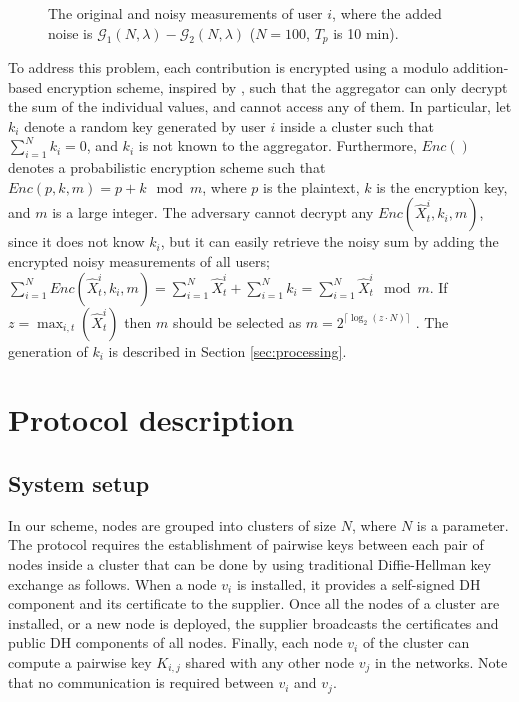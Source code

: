 \documentclass[11pt,a4paper]{article}
\theoremstyle{plain}
\theoremstyle{plain}
\theoremstyle{plain}
\theoremstyle{plain}
\theoremstyle{nonumberplain} \theoremseparator{}
\begin{document}
\begin{figure*}[ht]
\centering
{}
\caption{\label{fig:ill_noise} The original and noisy measurements of user $i$, where the added noise is $\mathcal{G}_{1}(N, \lambda) - \mathcal{G}_{2}(N, \lambda)$ ($N=100$, $T_{p}$ is 10 min). }
\end{figure*}

To address this problem, each contribution
is encrypted using a modulo addition-based encryption scheme, inspired by \cite{cc05mobiquitous}, 
such that the aggregator
can only decrypt the sum of the individual values, and cannot access any of them. 
In particular, let $k_i$ denote a random key generated by user $i$ inside a cluster such that $\sum_{i=1}^{N} k_i = 0$, and $k_i$ is not known to the aggregator. Furthermore, $Enc()$ denotes a probabilistic encryption scheme such that 
$Enc(p,k,m) = p + k \mod m$, where $p$ is the plaintext, $k$ is the encryption key, and $m$ is a large integer.
The adversary cannot decrypt any $\mathit{Enc}(\hat{X}_t^{i},k_i,m)$, since it does not know $k_i$, but it can easily retrieve the noisy sum by adding the encrypted noisy measurements of all users; $\sum_{i=1}^{N} Enc(\hat{X}_t^{i},k_i,m) = \sum_{i=1}^N \hat{X}_t^i + \sum_{i=1}^N k_i = \sum_{i=1}^N \hat{X}_t^i \mod m$. If $z=\max_{i,t}(\hat{X}_t^i)$ then $m$ should be selected as $m=2^{\lceil \log_2(z \cdot N) \rceil}$ \cite{cc05mobiquitous}. The generation of $k_i$ is described in Section \ref{sec:processing}.



\section{Protocol description}


\subsection{System setup}
\label{sec:setup}

In our scheme, nodes are grouped into clusters of size $N$, where $N$ is a
parameter. The protocol requires the establishment of pairwise keys between each
pair of nodes inside a cluster that can be done by using traditional Diffie-Hellman key 
exchange as follows. When a node $v_{i}$ is installed, it provides a self-signed DH component and its certificate to the supplier. 
Once all the nodes of a cluster are installed, or a new node is deployed, the supplier broadcasts the certificates and public DH components of all nodes. Finally, each node $v_i$ of the cluster can compute a pairwise key $K_{i,j}$ shared with any other node $v_j$ in the networks. Note that no communication is required between $v_i$ and $v_j$.
\end{document}
